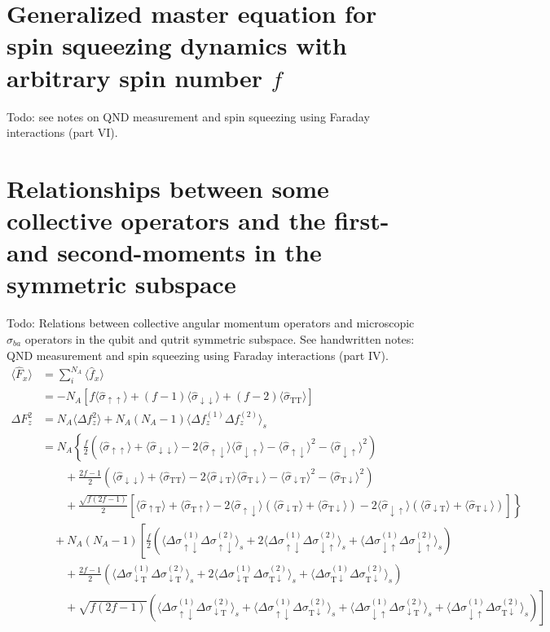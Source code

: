 \documentclass[pra,twocolumn,floatfix,superscriptaddress]{revtex4-1} %
\newcommand{\nn}{\nonumber}
\newcommand{\expect}[1]{\big\langle #1 \big\rangle}
\newcommand{\sigmauu}{\hat{\sigma}_{\uparrow\uparrow}}
\newcommand{\sigmaud}{\hat{\sigma}_{\uparrow\downarrow}}
\newcommand{\sigmaut}{\hat{\sigma}_{\uparrow \mathrm{T}}}
\newcommand{\sigmadu}{\hat{\sigma}_{\downarrow\uparrow}}
\newcommand{\sigmadd}{\hat{\sigma}_{\downarrow\downarrow}}
\newcommand{\sigmadt}{\hat{\sigma}_{\downarrow \mathrm{T}}}
\newcommand{\sigmatu}{\hat{\sigma}_{\mathrm{T}\uparrow}}
\newcommand{\sigmatd}{\hat{\sigma}_{\mathrm{T}\downarrow}}
\newcommand{\sigmatt}{\hat{\sigma}_{\mathrm{T}\mathrm{T}}}
\newcommand{\Dsigmaud}{\Delta\sigma_{\uparrow\downarrow}}
\newcommand{\Dsigmadu}{\Delta\sigma_{\downarrow\uparrow}}
\newcommand{\Dsigmadt}{\Delta\sigma_{\downarrow \mathrm{T}}}
\newcommand{\Dsigmatd}{\Delta\sigma_{\mathrm{T}\downarrow}}
\newcommand{\comment}[1]{{\color{Maroon} #1}}
\begin{document}
\begin{appendix}
\section{Generalized master equation for spin squeezing dynamics with arbitrary spin number $f$} \label{Appendix::OpticalPumpingForGeneralF}
\comment{Todo: see notes on QND measurement and spin squeezing using Faraday interactions (part VI).}


\section{Relationships between some collective operators and the first- and second-moments in the symmetric subspace} \label{Appendix::collectivespinoperators}

\comment{Todo: Relations between collective angular momentum operators and microscopic $\sigma_{ba}$ operators in the qubit and qutrit symmetric subspace. See handwritten notes: QND measurement and spin squeezing using Faraday interactions (part IV).}
\begin{subequations}
	\begin{align}
	\expect{\hat{F}_x} &= \sum_i^{N_A}\expect{\hat{f}_x}\nonumber\\
	&= -N_A \left[f\expect{\sigmauu}+(f-1)\expect{\sigmadd}+(f-2)\expect{\sigmatt } \right]\\
	\Delta F_z^2 &= N_A\expect{\Delta f_z^2} + N_A(N_A-1)\expect{\Delta f_z^{(1)}\Delta f_z^{(2)} }_s\nn\\
	&=N_A\left\{ \frac{f}{2}\left(\expect{\sigmauu}+\expect{\sigmadd}-2\expect{\sigmaud}\expect{\sigmadu}-\expect{\sigmaud}^2-\expect{\sigmadu}^2 \right)\right. \nn\\
	&\quad\quad+ \frac{2f-1}{2}\left(\expect{\sigmadd}+\expect{\sigmatt}-2\expect{\sigmadt}\expect{\sigmatd}-\expect{\sigmadt}^2-\expect{\sigmatd}^2 \right)\nn\\
	&\quad\quad +\left. \frac{\sqrt{f(2f-1)}}{2}\left[\expect{\sigmaut }+\expect{\sigmatu} -2\expect{\sigmaud}(\expect{\sigmadt}+\expect{\sigmatd}) -2\expect{\sigmadu}(\expect{\sigmadt}+\expect{\sigmatd} ) \right] \right\}\nn\\
	&\quad +N_A(N_A-1)\left[\frac{f}{2}(\expect{\Dsigmaud^{(1)}\Dsigmaud^{(2)} }_s +2\expect{\Dsigmaud^{(1)}\Dsigmadu^{(2)} }_s+\expect{\Dsigmadu^{(1)}\Dsigmadu^{(2)} }_s )\right.\\
	&\quad\quad + \frac{2f-1}{2}(\expect{\Dsigmadt^{(1)}\Dsigmadt^{(2)} }_s +2\expect{\Dsigmadt^{(1)}\Dsigmatd^{(2)} }_s +\expect{\Dsigmatd^{(1)}\Dsigmatd^{(2)} }_s) \nn\\
	&\quad\quad + \left. \sqrt{f(2f-1)}(\expect{\Dsigmaud^{(1)}\Dsigmadt^{(2)} }_s +\expect{\Dsigmaud^{(1)}\Dsigmatd^{(2)} }_s +\expect{\Dsigmadu^{(1)}\Dsigmadt^{(2)} }_s+\expect{\Dsigmadu^{(1)}\Dsigmatd^{(2)} }_s )\right]\nn
	\end{align}
\end{subequations}



\end{appendix}
\end{document}
